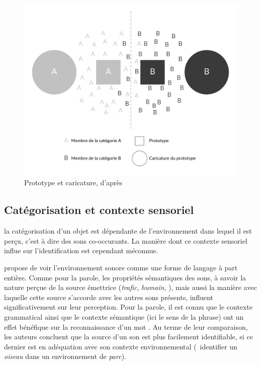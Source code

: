 {\begin{figure}[t]
        \myfloatalign
        \includegraphics[width=.8\linewidth]{gfx/ch_3/prototypeCaricature}
        \caption[Prototype et caricature]{Prototype et caricature, d'après \citep{davis2010memory}}\label{fig:prototypeCaricature}
\end{figure}


\subsection{Catégorisation et contexte sensoriel}
\label{sec:ch3_categoEtContexte}

la catégorisation d'un objet est dépendante de l'environnement dans lequel il est perçu, c'est à dire des sons co-occurants. La manière dont ce contexte sensoriel influe sur l'identification est cependant méconnue.

\citep{ballas1987interpreting} propose de voir l'environnement sonore comme une forme de langage à part entière. Comme pour la parole, les propriétés sémantiques des sons, à savoir la nature perçue de la source émettrice (\emph{trafic}, \emph{humain}, \etc), mais aussi la manière avec laquelle cette source s'accorde avec les autres sons présents, influent significativement sur leur perception. Pour la parole, il est connu que le contexte grammatical ainsi que le contexte sémantique (ici le sens de la phrase) ont un effet bénéfique sur la reconnaissance d'un mot \citep{bilger1984standardization}. Au terme de leur comparaison, les auteurs concluent que la source d'un son est plus facilement identifiable, si ce dernier est en adéquation avec son contexte environnemental (\eg~identifier un \emph{oiseau} dans un environnement de \emph{parc}).

}
